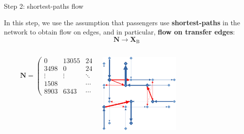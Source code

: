 \documentclass[10pt]{beamer}
\newcommand{\imp}[1]{\textbf{\color{cyan}#1}}
\begin{document}
	\begin{frame}{Step 2: shortest-paths flow}
		
		In this step, we use the assumption that passengers use \imp{shortest-paths} in the network to obtain flow on edges, and in particular, \imp{flow on transfer edges}:
		$$
			\mathbf{N} \longrightarrow \mathbf{X}_\text{B}
		$$ 
		\vspace{0.6cm}
		\begin{columns}
			\small
			\begin{column}{0.7\textwidth}
				$$
				\hspace{1cm} \mathbf{N} = \left( \begin{array}{ccccc}
				0 & 13055 & 243 & \cdots & 144 \\
				3498 & 0 & 24429 & \cdots & 7523 \\
				\vdots & \vdots & \ddots & \ddots & \vdots \\
				1508 &  & \cdots & 0 & 5093 \\
				8903 & 6343 & \cdots & 53 & 0 
				\end{array} \right) \rightarrow 
				$$ 
			\end{column}
			\begin{column}{0.6\textwidth}
				\hspace{0.5cm} \includegraphics[width=0.5\textwidth]{img/flow_computed.png}
			\end{column}
		\end{columns}
	\end{frame}
	
	
\end{document}
